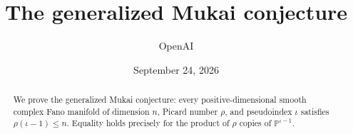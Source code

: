 \documentclass[11pt]{article}
\title{The generalized Mukai conjecture}
\author{OpenAI}
\date{September 24, 2026}
\theoremstyle{definition}
\theoremstyle{remark}
\begin{document}
\maketitle
\begin{abstract}
We prove the generalized Mukai conjecture: every positive-dimensional
smooth complex Fano manifold of dimension $n$, Picard number $\rho$, and
pseudoindex $\iota$ satisfies $\rho(\iota-1)\le n$. Equality holds
precisely for the product of $\rho$ copies of $\mathbb P^{\iota-1}$.
\end{abstract}
\tableofcontents
\clearpage








\end{document}
